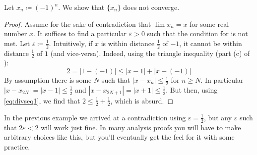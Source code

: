 \documentclass[../notes.tex]{subfiles}
\begin{document}
\begin{example}
    Let $x_n\coloneqq(-1)^n$. We show that $\{x_n\}$ does not converge.
\end{example}
\begin{proof}
    Assume for the sake of contradiction that $\lim x_n=x$ for some real number $x$. It suffices to find a particular $\varepsilon>0$ such that the condition for  is not met. 
    Let $\varepsilon\coloneqq\frac{1}{2}$. Intuitively, if $x$ is within distance $\frac{1}{2}$ of $-1$, it cannot be within distance $\frac{1}{2}$ of $1$ (and vice-versa). Indeed, using the triangle inequality (part (c) of ):
    \begin{equation}\label{eq:divseq1}
        2=|1-(-1)| \leq |x-1|+|x-(-1)| 
    \end{equation}
    By assumption there is some $N$ such that $|x-x_n|\leq \frac{1}{2}$ for  $n\geq N$. In particular $|x-x_{2N}| = |x-1|\leq \frac{1}{2}$ and $|x-x_{2N+1}|=|x+1|\leq \frac{1}{2}$. But then, using \eqref{eq:divseq1}, we find that $2\leq \frac{1}{2}+\frac{1}{2}$, which is absurd. 
\end{proof}
In the previous example we arrived at a contradiction using $\varepsilon=\frac{1}{2}$, but any $\varepsilon$ such that $2\varepsilon < 2$ will work just fine. In many analysis proofs you will have to make arbitrary choices like this, but you'll eventually get the feel for it with some practice. 
\end{document}
